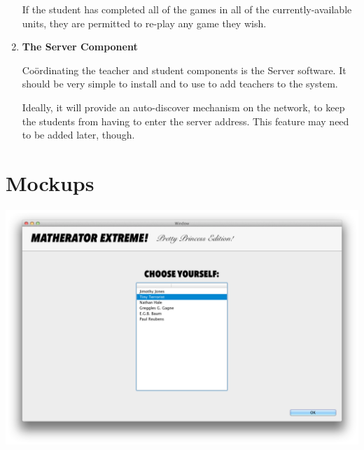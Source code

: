 \documentclass[11pt,a4paper,twoside]{report}
\begin{document}
\begin{enumerate}
If the student has completed all of the games in all of the currently-available units, they are permitted to re-play any game they wish.



\item  \textbf{The Server Component}

Coördinating the teacher and student components is the Server software. It should be very simple to install and to use to add teachers to the system.

Ideally, it will provide an auto-discover mechanism on the network, to keep the students from having to enter the server address. This feature may need to be added later, though.




\end{enumerate}







\chapter{Mockups}

\begin{center}
    \includegraphics[width=13.59cm]{ChooseYourself}
\end{center}
\end{document}

